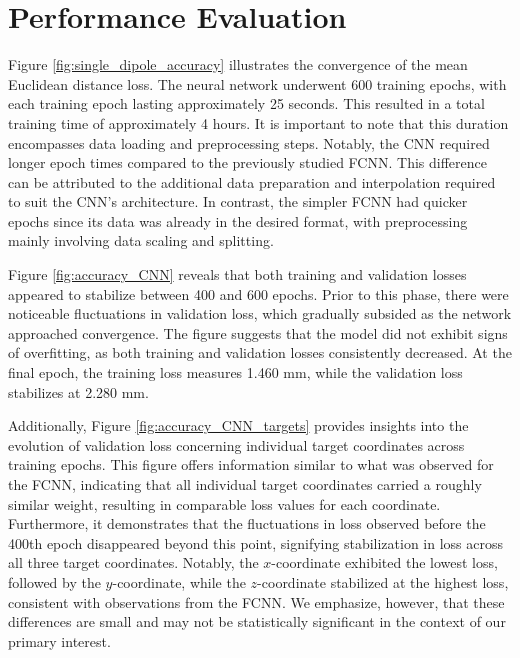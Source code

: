 \documentclass[a4paper, UKenglish, 11pt]{uiomaster}
\begin{document}

\section{Performance Evaluation}
Figure \ref{fig:single_dipole_accuracy} illustrates the convergence of the mean Euclidean distance loss. The neural network underwent 600 training epochs, with each training epoch lasting approximately 25 seconds. This resulted in a total training time of approximately 4 hours. It is important to note that this duration encompasses data loading and preprocessing steps. Notably, the CNN required longer epoch times compared to the previously studied FCNN. This difference can be attributed to the additional data preparation and interpolation required to suit the CNN's architecture. In contrast, the simpler FCNN had quicker epochs since its data was already in the desired format, with preprocessing mainly involving data scaling and splitting.

Figure \ref{fig:accuracy_CNN} reveals that both training and validation losses appeared to stabilize between 400 and 600 epochs. Prior to this phase, there were noticeable fluctuations in validation loss, which gradually subsided as the network approached convergence. The figure suggests that the model did not exhibit signs of overfitting, as both training and validation losses consistently decreased. At the final epoch, the training loss measures 1.460 mm, while the validation loss stabilizes at 2.280 mm.

Additionally, Figure \ref{fig:accuracy_CNN_targets} provides insights into the evolution of validation loss concerning individual target coordinates across training epochs. This figure offers information similar to what was observed for the FCNN, indicating that all individual target coordinates carried a roughly similar weight, resulting in comparable loss values for each coordinate. Furthermore, it demonstrates that the fluctuations in loss observed before the 400th epoch disappeared beyond this point, signifying stabilization in loss across all three target coordinates. Notably, the $x$-coordinate exhibited the lowest loss, followed by the $y$-coordinate, while the $z$-coordinate stabilized at the highest loss, consistent with observations from the FCNN. We emphasize, however, that these differences are small and may not be statistically significant in the context of our primary interest.
\end{document}
